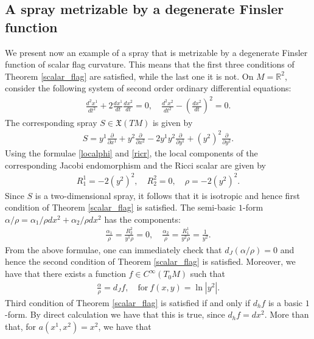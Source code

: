 \documentclass[oneside,english]{amsart}
\numberwithin{equation}{section}
\numberwithin{figure}{section}
\theoremstyle{plain}
\theoremstyle{plain}
\theoremstyle{definition}
\theoremstyle{plain}
\theoremstyle{plain}
\theoremstyle{plain}
\theoremstyle{remark}
\theoremstyle{remark}
\begin{document}
\subsection{A spray metrizable by a degenerate Finsler function}
We present now an example of a spray that is metrizable by a
degenerate Finsler function of scalar flag curvature. This means that the first three conditions
of Theorem \ref{scalar_flag}  are satisfied, while the last one it is
not. On $M=\mathbb{R}^2$, consider the following system of second
order ordinary differential equations:
\begin{eqnarray}
  \frac{d^2x^1}{dt^2} + 2\frac{dx^1}{dt}\frac{dx^2}{dt}=0, \quad
  \frac{d^2x^2}{dt^2} - \left(\frac{dx^2}{dt}\right)^2=0. \label{systemdf}
\end{eqnarray}
The corresponding spray $S\in \mathfrak{X}(TM)$ is given by 
\begin{eqnarray*}
  S=y^1\frac{\partial}{\partial x^1} + y^2\frac{\partial}{\partial x^2}
  - 2y^1y^2\frac{\partial}{\partial y^1} +
  (y^2)^2\frac{\partial}{\partial y^2}. \label{spraydf}
\end{eqnarray*}  
Using the formulae \eqref{localphi} and \eqref{ricr}, the local components of the
corresponding Jacobi endomorphism and the Ricci scalar are given by
\begin{eqnarray*}
  R^1_1= -2(y^2)^2, \quad R^2_2= 0, \quad \rho =  -2(y^2)^2.
\end{eqnarray*}
Since $S$ is a two-dimensional spray, it follows that it is isotropic
and hence first condition of Theorem \ref{scalar_flag}  is
satisfied. The semi-basic $1$-form $\alpha/\rho=\alpha_1/\rho dx^2 +
\alpha_2/\rho dx^2$ has the components:
\begin{eqnarray*}
  \frac{\alpha_1}{\rho}=\frac{R^2_2}{y^1\rho}=0, \quad
  \frac{\alpha_2}{\rho}=\frac{R^1_1}{y^2\rho}=\frac{1}{y^2}. \label{ardf}
\end{eqnarray*} 
From the above formulae, one can immediately check that
$d_J(\alpha/\rho)=0$ and hence the second condition of Theorem \ref{scalar_flag}  is
satisfied. Moreover, we have that there exists a function $f\in
C^{\infty}(T_0M)$ such that
\begin{eqnarray*}
  \frac{\alpha}{\rho}=d_Jf, \quad \textrm{for} \ f(x,y)=\ln
  |y^2|. \end{eqnarray*}
Third condition of Theorem \ref{scalar_flag}  is
satisfied if and only if $d_hf$ is a basic $1$-form. By direct
calculation we have that this is true, since 
$d_hf=dx^2$. More than that, for $a(x^1, x^2)=x^2$, we have that
\end{document}
